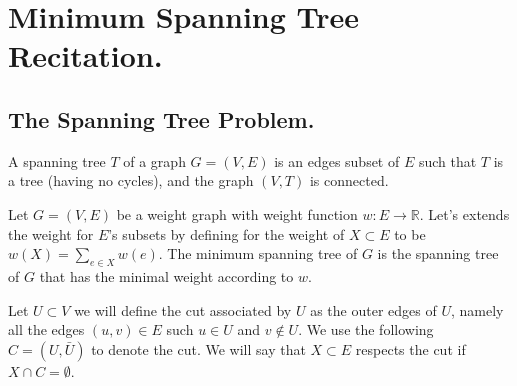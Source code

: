 


\ifdefined\BOOK
\else
\setcounter{chapter}{10}
\fi
\chapter{Minimum Spanning Tree Recitation.} 


\section{The Spanning Tree Problem.}


\begin{definition}
  A spanning tree $T$ of a graph $G=(V,E)$ is an edges subset of $E$ such that $T$ is a tree (having no cycles), and the graph $(V,T)$ is connected.   
\end{definition}

\begin{problem}[MST] Let $G = (V,E)$ be a weight graph with weight function $w : E \rightarrow \mathbb{R}$. Let's extends the weight for $E$'s subsets by defining for the weight of $X\subset E$ to be $w(X)= \sum_{e \in X}w(e)$. The minimum spanning tree of $G$ is the spanning tree of $G$ that has the minimal weight according to $w$.
\end{problem}

\begin{definition}
  Let $U \subset V$ we will define the cut associated by $U$ as the outer edges of $U$, namely all the edges $(u,v)\in E$ such $u\in U$ and $v \notin U$. We use the following $C = (U, \bar{U})$ to denote the cut. We will say that $X \subset E$ respects the cut if $X \cap C = \emptyset$.
\end{definition} 



